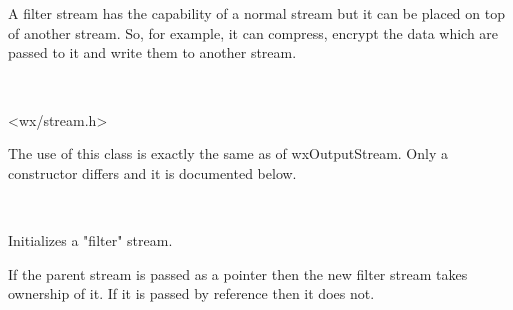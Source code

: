 \section{}\label{wxfilteroutputstream}

A filter stream has the capability of a normal
stream but it can be placed on top of another stream. So, for example, it
can compress, encrypt the data which are passed to it and write them to another
stream.


\\


<wx/stream.h>


The use of this class is exactly the same as of wxOutputStream. Only a constructor
differs and it is documented below.


\\


\label{wxfilteroutputstreamctor}



Initializes a "filter" stream.

If the parent stream is passed as a pointer then the new filter stream
takes ownership of it. If it is passed by reference then it does not.

